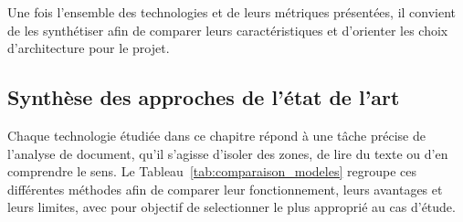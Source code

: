 Une fois l'ensemble des technologies et de leurs métriques présentées, il convient de les synthétiser afin de comparer leurs caractéristiques et d'orienter les choix d'architecture pour le projet.

\subsection{Synthèse des approches de l'état de l'art}

Chaque technologie étudiée dans ce chapitre répond à une tâche précise de l'analyse de document, qu'il s'agisse d'isoler des zones, de lire du texte ou d'en comprendre le sens. Le Tableau~\ref{tab:comparaison_modeles} regroupe ces différentes méthodes afin de comparer leur fonctionnement, leurs avantages et leurs limites, avec pour objectif de selectionner le plus approprié au cas d'étude.

